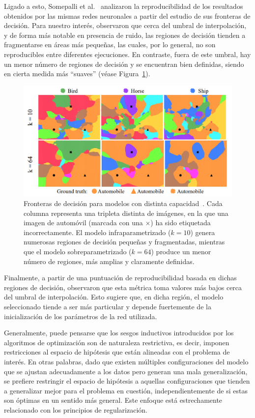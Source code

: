 Ligado a esto, Somepalli et al.~\cite{Somepalli2022} analizaron la reproducibilidad de los resultados obtenidos por las mismas redes neuronales a partir del estudio de sus fronteras de decisión. Para nuestro interés, observaron que cerca del umbral de interpolación, y de forma más notable en presencia de ruido, las regiones de decisión tienden a fragmentarse en áreas más pequeñas, las cuales, por lo general, no son reproducibles entre diferentes ejecuciones. En contraste, fuera de este umbral, hay un menor número de regiones de decisión y se encuentran bien definidas, siendo en cierta medida más ``suaves'' (véase Figura~\ref{fig:ground-truth-reproducibility}).

\begin{figure}[h]
    \centering
    \includegraphics[width=0.6\linewidth]{img/ground-truth-reproducibility.png}
    \caption[Fronteras de decisión para modelos con distinta capacidad~\cite{Somepalli2022}.]{Fronteras de decisión para modelos con distinta capacidad~\cite{Somepalli2022}. Cada columna representa una tripleta distinta de imágenes, en la que una imagen de automóvil (marcada con una $\times$) ha sido etiquetada incorrectamente. El modelo infraparametrizado ($k=10$) genera numerosas regiones de decisión pequeñas y fragmentadas, mientras que el modelo sobreparametrizado ($k=64$) produce un menor número de regiones, más amplias y claramente definidas.}\label{fig:ground-truth-reproducibility}
\end{figure}

Finalmente, a partir de una puntuación de reproducibilidad basada en dichas regiones de decisión, observaron que esta métrica toma valores más bajos cerca del umbral de interpolación. Esto sugiere que, en dicha región, el modelo seleccionado tiende a ser más particular y depende fuertemente de la inicialización de los parámetros de la red utilizada.

Generalmente, puede pensarse que los sesgos inductivos introducidos por los algoritmos de optimización son de naturaleza restrictiva, es decir, imponen restricciones al espacio de hipótesis que están alineadas con el problema de interés. En otras palabras, dado que existen múltiples configuraciones del modelo que se ajustan adecuadamente a los datos pero generan una mala generalización, se prefiere restringir el espacio de hipótesis a aquellas configuraciones que tienden a generalizar mejor para el problema en cuestión, independientemente de si estas son óptimas en un sentido más general. Este enfoque está estrechamente relacionado con los principios de regularización.


